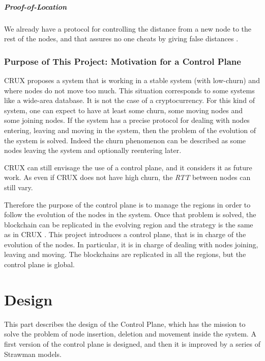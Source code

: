 \documentclass[a4paper,11pt,twoside=semi,openright]{report}
\begin{document}
\paragraph{Proof-of-Location} We already have a protocol for controlling the
distance from a new node to the rest of the nodes, and that assures no one
cheats by giving false distances \cite{Kall2019}. 

\subsection{Purpose of This Project: Motivation for a Control Plane}

CRUX \cite{Basescu2014} proposes a system that is working in a stable system
(with low-churn) and where nodes do not move too much. This situation
corresponds to some systems like a wide-area database. It is not
the case of a cryptocurrency. For this kind of system, one can expect to have
at least some churn, some moving nodes and some joining nodes. If the
system has a precise protocol for dealing with nodes entering, leaving and
moving in the system, then the problem of the evolution of the system is
solved. Indeed the churn phenomenon can be described as some nodes leaving the
system and optionally reentering later. 

CRUX \cite{Basescu2014} can still envisage the use of a control plane, and it
considers it as future work. As even if CRUX  \cite{Basescu2014} does not have
high churn, the \textit{RTT} between nodes can still vary. 

Therefore the purpose of the control plane is to manage the regions in order to
follow the evolution of the nodes in the system. Once that problem is solved,
the blockchain can be replicated in the evolving region and the strategy is the
same as in CRUX \cite{Basescu2014}. This project introduces a control plane,
that is in charge of the evolution of the nodes. In particular, it is in charge
of dealing with nodes joining, leaving and moving. The blockchains are
replicated in all the regions, but the control plane is global. 

\chapter{Design} \label{chap:Design} %

This part describes the design of the Control Plane, which has the mission to
solve the problem of node insertion, deletion and movement inside the system. A
first version of the control plane is designed, and then it is improved by a
series of Strawman models.
\end{document}
